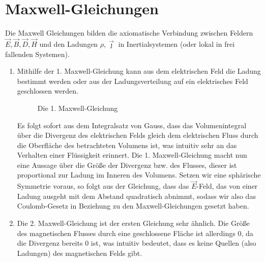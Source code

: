 \documentclass{../../theo-lecture/lecture}
\begin{document}
    \section{Maxwell-Gleichungen}
    Die Maxwell Gleichungen bilden die axiomatische Verbindung zwischen Feldern
    $\vec{E}, \vec{B}, \vec{D}, \vec{H}$ und den Ladungen $\rho, \vec{\jmath}$
    in Inertialsystemen (oder lokal in frei fallenden Systemen).
    \begin{enumerate}[(1)]
        \item Mithilfe der 1. Maxwell-Gleichung kann aus dem elektrischen Feld die Ladung bestimmt werden oder aus der Ladungsverteilung auf ein elektrisches Feld geschlossen werden.
        \begin{figure}[h]
            \centering
            \caption{Die 1. Maxwell-Gleichung}
        \end{figure}
        Es folgt sofort aus dem Integralsatz von Gauss, dass das Volumenintegral über die Divergenz des elektrischen Felds gleich dem elektrischen Fluss durch die Oberfläche des betrachteten Volumens ist, was intuitiv sehr an das Verhalten einer Flüssigkeit erinnert. Die 1. Maxwell-Gleichung macht nun eine Aussage über die Größe der Divergenz bzw. des Flusses, dieser ist proportional zur Ladung im Inneren des Volumens.
        Setzen wir eine sphärische Symmetrie voraus, so folgt aus der Gleichung, dass das $\vec E$-Feld, das von einer Ladung ausgeht mit dem Abstand quadratisch abnimmt, sodass wir also das Coulomb-Gesetz in Beziehung zu den Maxwell-Gleichungen gesetzt haben.
        \item Die 2. Maxwell-Gleichung ist der ersten Gleichung sehr ähnlich. Die Größe des magnetischen Flusses durch eine geschlossene Fläche ist allerdings 0, da die Divergenz bereits 0 ist, was intuitiv bedeutet, dass es keine Quellen (also Ladungen) des magnetischen Felds gibt.
        \begin{figure}[ht]
            \centering
\end{figure}
\end{enumerate}
\end{document}
